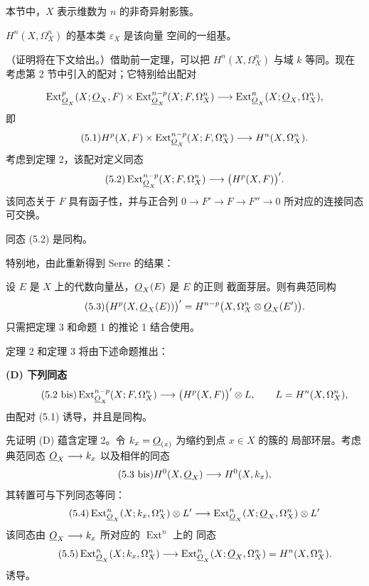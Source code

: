 
本节中，$X$ 表示维数为 $n$ 的非奇异射影簇。

 $H^{n}(X,\Omega_X^{n})$ 的基本类 $\varepsilon_X$ 是该向量
空间的一组基。

（证明将在下文给出。）借助前一定理，可以把 $H^{n}(X,\Omega_X^{n})$ 与域
$k$ 等同。现在考虑第 2 节中引入的配对；它特别给出配对

\[
\operatorname{Ext}_{\underline{O}_X}^{p}(X;\underline{O}_X,F)
\times\operatorname{Ext}_{\underline{O}_X}^{n-p}(X;F,\Omega_X^{n})
\longrightarrow
\operatorname{Ext}_{\underline{O}_X}^{n}(X;\underline{O}_X,\Omega_X^{n}),
\]
即
\begin{equation}\tag{5.1}
  H^{p}(X,F)
  \times\operatorname{Ext}_{\underline{O}_X}^{n-p}(X;F,\Omega_X^{n})
  \longrightarrow H^{n}(X,\Omega_X^{n}).
\end{equation}
考虑到定理 2，该配对定义同态
\begin{equation}\tag{5.2}
  \operatorname{Ext}_{\underline{O}_X}^{n-p}(X;F,\Omega_X^{n})
  \longrightarrow\bigl(H^{p}(X,F)\bigr)'.
\end{equation}
该同态关于 $F$ 具有函子性，并与正合列
$0\longrightarrow F'\longrightarrow F\longrightarrow F''\longrightarrow0$
所对应的连接同态可交换。

 同态 (5.2) 是同构。

特别地，由此重新得到 Serre 的结果：

 设 $E$ 是 $X$ 上的代数向量丛，$\underline{O}_X(E)$ 是 $E$ 的正则
截面芽层。则有典范同构
\begin{equation}\tag{5.3}
  \bigl(H^{p}(X,\underline{O}_X(E))\bigr)'
  =H^{n-p}\bigl(X,\Omega_X^{n}\otimes\underline{O}_X(E')\bigr).
\end{equation}
只需把定理 3 和命题 1 的推论 1 结合使用。

定理 2 和定理 3 将由下述命题推出：

\noindent\textbf{(D) 下列同态}
\begin{equation}\tag{5.2 bis}
  \operatorname{Ext}_{\underline{O}_X}^{n-p}(X;F,\Omega_X^{n})
  \longrightarrow\bigl(H^{p}(X,F)\bigr)'\otimes L,
  \qquad L=H^{n}(X,\Omega_X^{n}),
\end{equation}
由配对 (5.1) 诱导，并且是同构。

先证明 (D) 蕴含定理 2。令 $k_x=\underline{O}_{(x)}$ 为缩约到点 $x\in X$ 的簇的
局部环层。考虑典范同态 $\underline{O}_X\longrightarrow k_x$ 以及相伴的同态
\begin{equation}\tag{5.3 bis}
  H^{0}(X,\underline{O}_X)\longrightarrow H^{0}(X,k_x),
\end{equation}
其转置可与下列同态等同：
\begin{equation}\tag{5.4}
  \operatorname{Ext}_{\underline{O}_X}^{n}(X;k_x,\Omega_X^{n})\otimes L'
  \longrightarrow
  \operatorname{Ext}_{\underline{O}_X}^{n}(X;\underline{O}_X,\Omega_X^{n})\otimes L'
\end{equation}
该同态由 $\underline{O}_X\longrightarrow k_x$ 所对应的 $\operatorname{Ext}^{n}$ 上的
同态
\begin{equation}\tag{5.5}
  \operatorname{Ext}_{\underline{O}_X}^{n}(X;k_x,\Omega_X^{n})
  \longrightarrow
  \operatorname{Ext}_{\underline{O}_X}^{n}(X;\underline{O}_X,\Omega_X^{n})
  =H^{n}(X,\Omega_X^{n}).
\end{equation}
诱导。

